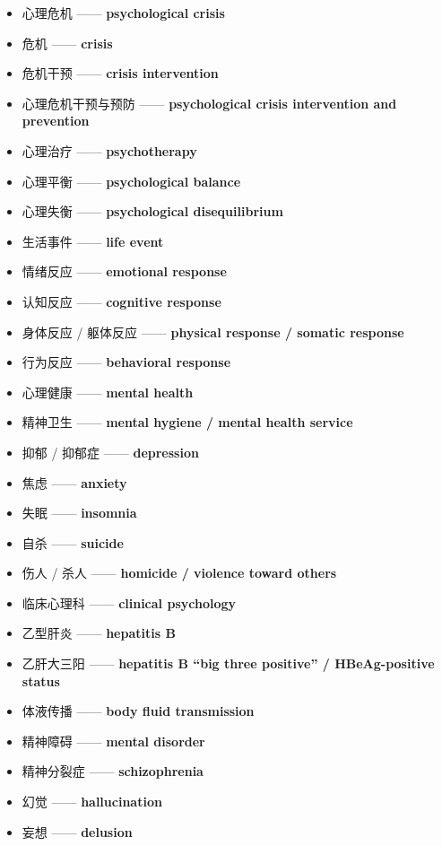 \documentclass[
  chinese,
  9pt,
  a4paper,
]{ctexart}
\providecommand{\tightlist}{%
  \setlength{\itemsep}{0pt}\setlength{\parskip}{0pt}}
\begin{document}
\begin{itemize}
\tightlist
\item
  心理危机 ------ \textbf{psychological crisis}
\item
  危机 ------ \textbf{crisis}
\item
  危机干预 ------ \textbf{crisis intervention}
\item
  心理危机干预与预防 ------ \textbf{psychological crisis intervention
  and prevention}
\item
  心理治疗 ------ \textbf{psychotherapy}
\item
  心理平衡 ------ \textbf{psychological balance}
\item
  心理失衡 ------ \textbf{psychological disequilibrium}
\item
  生活事件 ------ \textbf{life event}
\item
  情绪反应 ------ \textbf{emotional response}
\item
  认知反应 ------ \textbf{cognitive response}
\item
  身体反应 / 躯体反应 ------ \textbf{physical response / somatic
  response}
\item
  行为反应 ------ \textbf{behavioral response}
\item
  心理健康 ------ \textbf{mental health}
\item
  精神卫生 ------ \textbf{mental hygiene / mental health service}
\item
  抑郁 / 抑郁症 ------ \textbf{depression}
\item
  焦虑 ------ \textbf{anxiety}
\item
  失眠 ------ \textbf{insomnia}
\item
  自杀 ------ \textbf{suicide}
\item
  伤人 / 杀人 ------ \textbf{homicide / violence toward others}
\item
  临床心理科 ------ \textbf{clinical psychology}
\item
  乙型肝炎 ------ \textbf{hepatitis B}
\item
  乙肝大三阳 ------ \textbf{hepatitis B ``big three positive'' /
  HBeAg-positive status}
\item
  体液传播 ------ \textbf{body fluid transmission}
\item
  精神障碍 ------ \textbf{mental disorder}
\item
  精神分裂症 ------ \textbf{schizophrenia}
\item
  幻觉 ------ \textbf{hallucination}
\item
  妄想 ------ \textbf{delusion}

\end{itemize}
\end{document}
